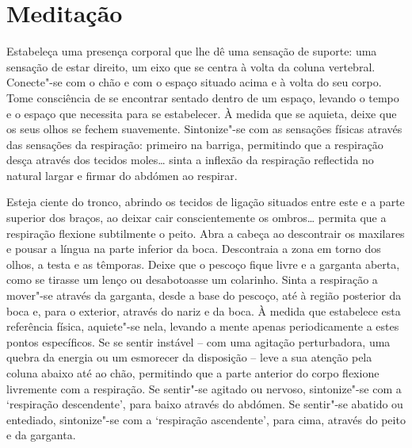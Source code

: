 
\chapter{Meditação}


Estabeleça uma presença corporal que lhe dê uma sensação de suporte: uma sensação de estar direito, um eixo que se centra à volta da coluna vertebral. Conecte"-se com o chão e com o espaço situado acima e à volta do seu corpo. Tome consciência de se encontrar sentado dentro de um espaço, levando o tempo e o espaço que necessita para se estabelecer. À medida que se aquieta, deixe que os seus olhos se fechem suavemente. Sintonize"-se com as sensações físicas através das sensações da respiração: primeiro na barriga, permitindo que a respiração desça através dos tecidos moles\ldots{} sinta a inflexão da respiração reflectida no natural largar e firmar do abdómen ao respirar.

Esteja ciente do tronco, abrindo os tecidos de ligação situados entre este e a parte superior dos braços, ao deixar cair conscientemente os ombros\ldots{} permita que a respiração flexione subtilmente o peito. Abra a cabeça ao descontrair os maxilares e pousar a língua na parte inferior da boca. Descontraia a zona em torno dos olhos, a testa e as têmporas. Deixe que o pescoço fique livre e a garganta aberta, como se tirasse um lenço ou desabotoasse um colarinho. Sinta a respiração a mover"-se através da garganta, desde a base do pescoço, até à região posterior da boca e, para o exterior, através do nariz e da boca. À medida que estabelece esta referência física, aquiete"-se nela, levando a mente apenas periodicamente a estes pontos específicos. Se se sentir instável -- com uma agitação perturbadora, uma quebra da energia ou um esmorecer da disposição -- leve a sua atenção pela coluna abaixo até ao chão, permitindo que a parte anterior do corpo flexione livremente com a respiração. Se sentir"-se agitado ou nervoso, sintonize"-se com a `respiração descendente', para baixo através do abdómen. Se sentir"-se abatido ou entediado, sintonize"-se com a `respiração ascendente', para cima, através do peito e da garganta.

